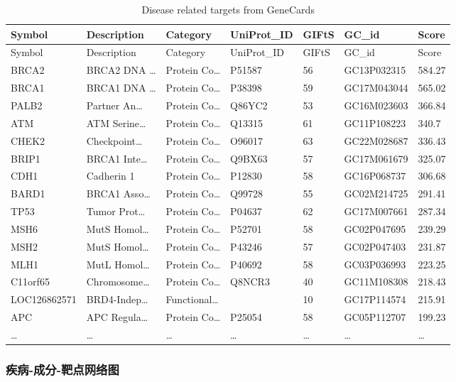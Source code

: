 \documentclass[
]{article}
\begin{document}
\begin{longtable}[]{@{}lllllll@{}}
\caption{\label{tab:Disease-related-targets-from-GeneCards}Disease related targets from GeneCards}\tabularnewline
\toprule
Symbol & Description & Category & UniProt\_ID & GIFtS & GC\_id & Score\tabularnewline
\midrule
\endfirsthead
\toprule
Symbol & Description & Category & UniProt\_ID & GIFtS & GC\_id & Score\tabularnewline
\midrule
\endhead
BRCA2 & BRCA2 DNA \ldots{} & Protein Co\ldots{} & P51587 & 56 & GC13P032315 & 584.27\tabularnewline
BRCA1 & BRCA1 DNA \ldots{} & Protein Co\ldots{} & P38398 & 59 & GC17M043044 & 565.02\tabularnewline
PALB2 & Partner An\ldots{} & Protein Co\ldots{} & Q86YC2 & 53 & GC16M023603 & 366.84\tabularnewline
ATM & ATM Serine\ldots{} & Protein Co\ldots{} & Q13315 & 61 & GC11P108223 & 340.7\tabularnewline
CHEK2 & Checkpoint\ldots{} & Protein Co\ldots{} & O96017 & 63 & GC22M028687 & 336.43\tabularnewline
BRIP1 & BRCA1 Inte\ldots{} & Protein Co\ldots{} & Q9BX63 & 57 & GC17M061679 & 325.07\tabularnewline
CDH1 & Cadherin 1 & Protein Co\ldots{} & P12830 & 58 & GC16P068737 & 306.68\tabularnewline
BARD1 & BRCA1 Asso\ldots{} & Protein Co\ldots{} & Q99728 & 55 & GC02M214725 & 291.41\tabularnewline
TP53 & Tumor Prot\ldots{} & Protein Co\ldots{} & P04637 & 62 & GC17M007661 & 287.34\tabularnewline
MSH6 & MutS Homol\ldots{} & Protein Co\ldots{} & P52701 & 58 & GC02P047695 & 239.29\tabularnewline
MSH2 & MutS Homol\ldots{} & Protein Co\ldots{} & P43246 & 57 & GC02P047403 & 231.87\tabularnewline
MLH1 & MutL Homol\ldots{} & Protein Co\ldots{} & P40692 & 58 & GC03P036993 & 223.25\tabularnewline
C11orf65 & Chromosome\ldots{} & Protein Co\ldots{} & Q8NCR3 & 40 & GC11M108308 & 218.43\tabularnewline
LOC126862571 & BRD4-Indep\ldots{} & Functional\ldots{} & & 10 & GC17P114574 & 215.91\tabularnewline
APC & APC Regula\ldots{} & Protein Co\ldots{} & P25054 & 58 & GC05P112707 & 199.23\tabularnewline
\ldots{} & \ldots{} & \ldots{} & \ldots{} & \ldots{} & \ldots{} & \ldots{}\tabularnewline
\bottomrule
\end{longtable}

\begin{center}\vspace{1.5cm}\end{center}

\hypertarget{ux75beux75c5-ux6210ux5206-ux9776ux70b9ux7f51ux7edcux56fe}{%
\subsubsection{疾病-成分-靶点网络图}\label{ux75beux75c5-ux6210ux5206-ux9776ux70b9ux7f51ux7edcux56fe}}
\end{document}
